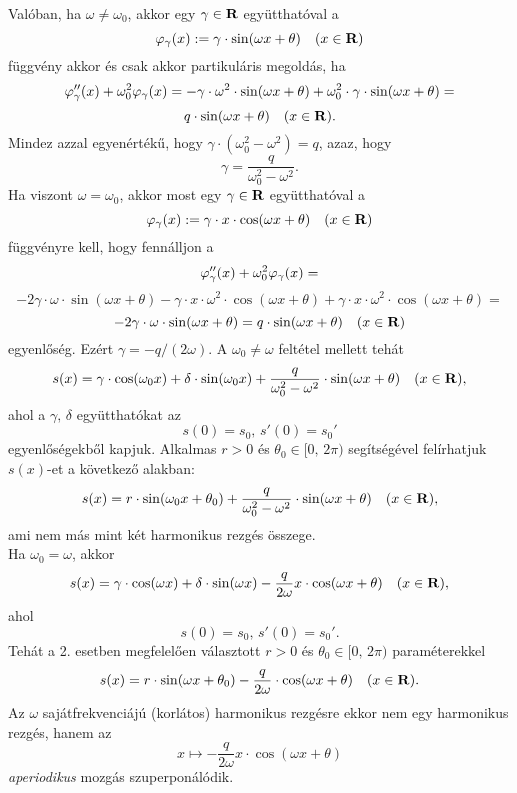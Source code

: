 Valóban, ha $\omega \neq \omega_0$, akkor egy $\gamma \in \mathbf{R}$ együtthatóval a
\[
	\varphi_\gamma(x) := \gamma \cdot \sin(\omega x + \theta) \quad (x \in \mathbf{R})
\]
függvény akkor és csak akkor partikuláris megoldás, ha
\[
	\varphi_\gamma''(x) + \omega_0^2 \varphi_\gamma(x) = - \gamma \cdot \omega^2 \cdot \sin(\omega x + \theta) + \omega_0^2 \cdot \gamma \cdot \sin(\omega x + \theta) =
\]
\[
	q \cdot \sin(\omega x + \theta) \quad (x \in \mathbf{R}).
\]
Mindez azzal egyenértékű, hogy $\gamma \cdot (\omega_0^2 - \omega^2) = q$, azaz, hogy
\[
	\gamma = \frac{q}{\omega_0^2 - \omega^2}.
\]
Ha viszont $\omega = \omega_0$, akkor most egy $\gamma \in \mathbf{R}$ együtthatóval a
\[
	\varphi_\gamma(x) := \gamma \cdot x \cdot \cos(\omega x + \theta) \quad (x \in \mathbf{R})
\]
függvényre kell, hogy fennálljon a
\[
	\varphi_\gamma''(x) + \omega_0^2 \varphi_\gamma(x) =
\]
\[
	-2 \gamma \cdot \omega \cdot \sin(\omega x + \theta) - \gamma \cdot x \cdot \omega^2 \cdot \cos(\omega x + \theta) + \gamma \cdot x \cdot \omega^2 \cdot \cos(\omega x + \theta) =
\]
\[
	- 2 \gamma \cdot \omega \cdot \sin(\omega x + \theta) = q \cdot \sin(\omega x + \theta) \quad (x \in \mathbf{R})
\]
egyenlőség. Ezért $\gamma = - q / (2\omega)$.
A $\omega_0 \neq \omega$ feltétel mellett tehát
\[
	s(x) = \gamma \cdot \cos(\omega_0 x) + \delta \cdot \sin(\omega_0 x) + \frac{q}{\omega_0^2 - \omega^2} \cdot \sin(\omega x + \theta) \quad (x \in \mathbf{R}),
\]
ahol a $\gamma, \, \delta$ együtthatókat az
\[
	s(0) = s_0, \, s'(0) = s_0'
\]
egyenlőségekből kapjuk. Alkalmas $r > 0$ és $\theta_0 \in [0, \, 2\pi)$ segítségével felírhatjuk $s(x)$-et a következő alakban:
\[
	s(x) = r \cdot \sin(\omega_0 x + \theta_0) + \frac{q}{\omega_0^2 - \omega^2} \cdot \sin(\omega x + \theta) \quad (x \in \mathbf{R}),
\]
ami nem más mint két harmonikus rezgés összege.\\

Ha $\omega_0 = \omega$, akkor
\[
	s(x) = \gamma \cdot \cos(\omega x) + \delta \cdot \sin(\omega x) - \frac{q}{2\omega} x \cdot \cos(\omega x + \theta) \quad (x \in \mathbf{R}),
\]
ahol
\[
	s(0) = s_0, \, s'(0) = s_0'.
\]
Tehát a 2. esetben megfelelően választott $r > 0$ és $\theta_0 \in [0, \, 2\pi)$ paraméterekkel 
\[
	s(x) = r \cdot \sin(\omega x + \theta_0) - \frac{q}{2\omega} \cdot \cos(\omega x + \theta) \quad (x \in \mathbf{R}).
\]
Az $\omega$ sajátfrekvenciájú (korlátos) harmonikus rezgésre ekkor nem egy harmonikus rezgés, hanem az
\[
	x \mapsto - \frac{q}{2 \omega} x \cdot \cos(\omega x + \theta)
\]
\textit{aperiodikus} mozgás szuperponálódik. 
